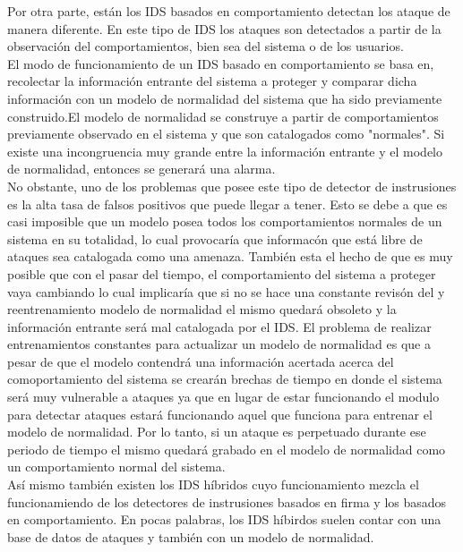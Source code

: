 \documentclass{article}
\begin{document}
Por otra parte, est\'an los IDS basados en comportamiento detectan los ataque de manera diferente. En este tipo de IDS los ataques son detectados a partir de la observaci\'on del comportamientos, bien sea del sistema o de los usuarios. \\

El modo de funcionamiento de un IDS basado en comportamiento se basa en, recolectar la informaci\'on entrante del sistema a proteger y comparar dicha informaci\'on con un modelo de normalidad del sistema que ha sido previamente construido.El modelo de normalidad se construye a partir de comportamientos previamente observado en el sistema y que son catalogados como "normales". Si existe una incongruencia muy grande entre la informaci\'on entrante y el modelo de normalidad, entonces se generar\'a una alarma.\\

No obstante, uno de los problemas que posee este tipo de detector de instrusiones es la alta tasa de falsos positivos que puede llegar a tener. Esto se debe a que es casi imposible que un modelo posea todos los comportamientos normales de un sistema en su totalidad, lo cual provocar\'ia que informac\'on que est\'a libre de ataques sea catalogada como una amenaza. Tambi\'en esta el hecho de que es muy posible que con el pasar del tiempo, el comportamiento del sistema a proteger vaya cambiando lo cual implicar\'ia que si no se hace una constante revis\'on del y reentrenamiento modelo de normalidad el mismo quedar\'a obsoleto y la informaci\'on entrante ser\'a mal catalogada por el IDS. El problema de realizar entrenamientos constantes para actualizar un modelo de normalidad es que a pesar de que el modelo contendr\'a una informaci\'on acertada acerca del comoportamiento del sistema se crear\'an brechas de tiempo en donde el sistema ser\'a muy vulnerable a ataques ya que en lugar de estar funcionando el modulo para detectar ataques estar\'a funcionando aquel que funciona para entrenar el modelo de normalidad. Por lo tanto, si un ataque es perpetuado durante ese periodo de tiempo el mismo quedar\'a grabado en el modelo de normalidad como un comportamiento normal del sistema.\\

As\'i mismo tambi\'en existen los IDS h\'ibridos cuyo funcionamiento mezcla el funcionamiendo de los detectores de instrusiones basados en firma y los basados en comportamiento. En pocas palabras, los IDS h\'ibirdos suelen contar con una base de datos de ataques y tambi\'en con un modelo de normalidad.\\
\end{document}
